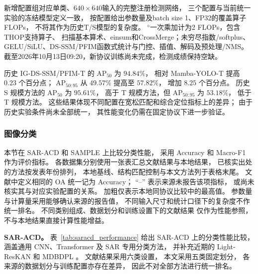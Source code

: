 \begin{table}[!t]
\begin{minipage}{\linewidth}
新增配置组对应单类、$640\times640$输入的完整注册检测网络，
三个配置与当前统一实验的冻结模型定义一致，
按配置给出参数量及batch size 1、FP32的覆盖算子FLOPs，
不将其作为历史T/S模型的复杂度。
$^{\diamond}$一次乘加计为2 FLOPs，包含THOP支持算子、
扫描基本算术、einsum和CrossMerge；未穷尽指数/softplus、
GELU/SiLU、DS-SSM/PFIM函数式统计与门控、插值、解码及预处理/NMS。
截至2026年10月13日09:20，新协议训练尚未完成，检测成绩保持空缺。
\end{minipage}
\end{table}

历史 IG-DS-SSM/PFIM-T 的 AP$_{50}$ 为 $94.84\%$，
相对 Mamba-YOLO-T 提高 $0.23$ 个百分点；
AP$_{50:95}$ 从 $49.57\%$ 提高至 $57.82\%$，
增加 $8.25$ 个百分点。
历史 S 规模方法的 AP$_{50}$ 为 $95.61\%$，
高于 T 规模方法，但 AP$_{50:95}$ 为 $53.18\%$，
低于 T 规模方法。
这些结果体现不同配置在宽松匹配和综合定位指标上的差异；
由于历史实验条件尚未全部统一，
其性能变化仍需在固定协议下进一步验证。

\FloatBarrier
\subsubsection{图像分类}
\label{sec:classification_results}

本节在 SAR-ACD 和 SAMPLE 上比较分类性能，
采用 Accuracy 和 Macro-F1 作为评价指标。
各数据集分别使用一张表汇总文献结果与本地结果，
已核实出处的方法按发表年份排列，
本地基线、结构匹配控制与本文方法列于表格末尾。
文献中定义相同的 OA 统一记为 Accuracy；
``--'' 表示来源未报告该项指标，
或尚未核实其与对应实验配置的关系。
加粗仅表示本地同协议比较中的最高值。
参数量与计算量采用能够确认来源的报告值，
不同输入尺寸和统计口径下的复杂度不作统一排名。
不同类别组成、数据划分和训练设置下的文献结果
仅作为性能参照，不与本地结果直接计算性能增益。

\textbf{SAR-ACD。}
表~\ref{tab:saracd_performance}
给出 SAR-ACD 上的分类性能比较，
涵盖通用 CNN、Transformer
及 SAR 专用分类方法，
并补充近期的 Light-ResKAN 和 MDBDPL
\cite{summit2025,busip2025,lightreskan2026,mdbdpl2027}。
文献结果采用六类设置，
本文采用五类固定划分，
各来源的数据划分与训练配置亦存在差异，
因此不对全部方法进行统一排名。

